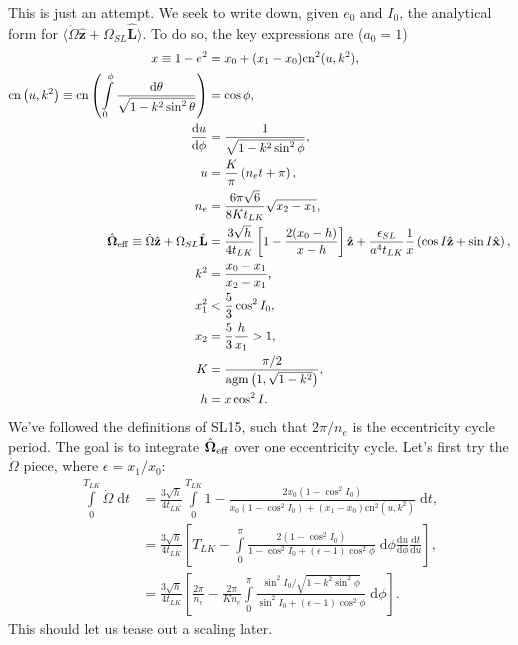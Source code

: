 \documentclass[11pt,
        usenames, %
        dvipsnames %
    ]{article}
\newcommand*{\rd}[2]{\frac{\mathrm{d}#1}{\mathrm{d}#2}}
\newcommand*{\bm}[1]{\boldsymbol{\mathbf{#1}}}
\newcommand*{\uv}[1]{\hat{\bm{#1}}}
\newcommand*{\ev}[1]{\langle#1\rangle}
\newcommand*{\p}[1]{\left(#1\right)}
\newcommand*{\s}[1]{\left[#1\right]}
\begin{document}
This is just an attempt. We seek to write down, given $e_0$ and $I_0$, the
analytical form for $\ev{\dot{\Omega}\uv{z} + \Omega_{SL}\uv{L}}$. To do so, the
key expressions are ($a_0 = 1$)
\begin{align}
    x \equiv 1 - e^2
        &= x_0 + (x_1 - x_0)\mathrm{cn}^2(u, k^2),\\
    \mathrm{cn}\p{u, k^2} \equiv \mathrm{cn}\p{
        \int\limits_{0}^\phi \frac{\mathrm{d}\theta}{\sqrt{1 - k^2\sin^2\theta}}
    } &= \cos \phi,\\
    \rd{u}{\phi} &= \frac{1}{\sqrt{1 - k^2\sin^2\phi}},\\
    u &= \frac{K}{\pi}\p{n_et + \pi},\\
    n_e &= \frac{6\pi \sqrt{6}}{8Kt_{LK}}\sqrt{x_2 - x_1},\\
    \uv{\Omega}_{\rm eff} \equiv \dot{\Omega}\uv{z} + \Omega_{SL}\uv{L}
        &= \frac{3\sqrt{h}}{4t_{LK}}\s{1 - \frac{2(x_0 - h)}{x - h}}\uv{z}
            + \frac{\epsilon_{SL}}{a^4t_{LK}}\frac{1}{x}
                \p{\cos I \uv{z} + \sin I \uv{x}},\\
    k^2 &= \frac{x_0 - x_1}{x_2 - x_1},\\
    x_1^2 &< \frac{5}{3}\cos^2 I_0,\\
    x_2 &= \frac{5}{3}\frac{h}{x_1} > 1,\\
    K &= \frac{\pi/2}{\mathrm{agm}\p{1, \sqrt{1 - k^2}}},\\
    h &= x\cos^2 I.
\end{align}
We've followed the definitions of SL15, such that $2\pi / n_e$ is the
eccentricity cycle period. The goal is to integrate $\uv{\Omega}_{\rm eff}$ over
one eccentricity cycle. Let's first try the $\dot{\Omega}$ piece, where
$\epsilon = x_1 / x_0$:
\begin{align}
    \int\limits_0^{T_{LK}} \dot{\Omega}\;\mathrm{d}t
        &= \frac{3\sqrt{h}}{4t_{LK}} \int\limits_0^{T_{LK}}
            1 - \frac{2x_0\p{1 - \cos^2 I_0}}{
                x_0\p{1 - \cos^2 I_0} +
                    \p{x_1 - x_0}\mathrm{cn}^2(u, k^2)}\;\mathrm{d}t,\\
        &= \frac{3\sqrt{h}}{4t_{LK}}
            \s{T_{LK} - \int\limits_0^\pi
                \frac{2\p{1 - \cos^2 I_0}}{
                    1 - \cos^2 I_0 + \p{\epsilon - 1}
                        \cos^2 \phi}\;\mathrm{d}\phi
                        \rd{u}{\phi}\rd{t}{u}},\\
        &= \frac{3\sqrt{h}}{4t_{LK}}
            \s{\frac{2\pi}{n_e} - \frac{2\pi}{Kn_e}\int\limits_0^\pi
                \frac{\sin^2 I_0 / \sqrt{1 - k^2\sin^2\phi}}{
                    \sin^2 I_0 + \p{\epsilon - 1}
                        \cos^2 \phi}\;\mathrm{d}\phi}.
\end{align}
This should let us tease out a scaling later.
\end{document}
